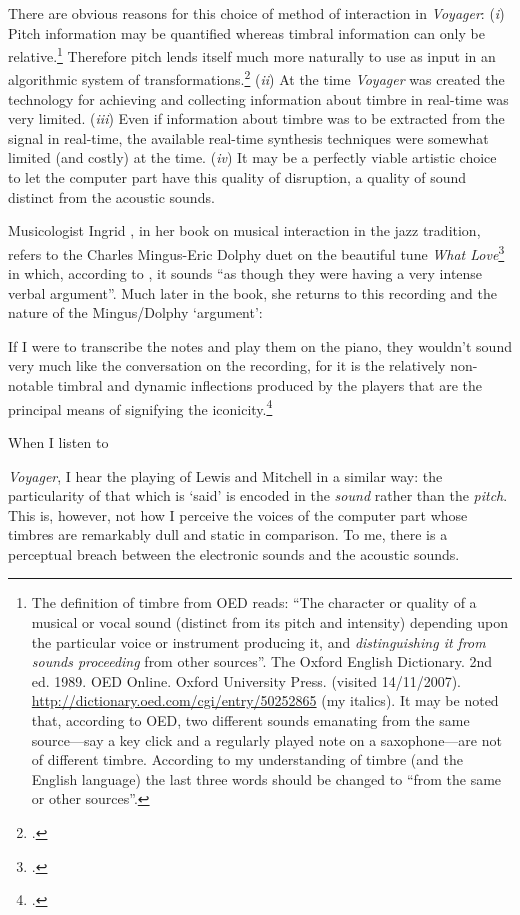 There are obvious reasons for this choice of method of interaction in \emph{Voyager}: (\textit{i}) Pitch information may be quantified whereas timbral information can only be relative.\footnote{The definition of timbre from OED reads: ``The character or quality of a musical or vocal sound (distinct from its pitch and intensity) depending upon the particular voice or instrument producing it, and \emph{distinguishing it from sounds proceeding} from other sources''. The Oxford English Dictionary.  2nd ed. 1989. OED Online. Oxford University Press. (visited 14/11/2007). \url{http://dictionary.oed.com/cgi/entry/50252865} (my italics). It may be noted that, according to OED, two different sounds emanating from the same source---say a key click and a regularly played note on a saxophone---are not of different timbre. According to my understanding of timbre (and the English language) the last three words should be changed to ``from the same or other sources''.} Therefore pitch lends itself much more naturally to use as input in an algorithmic system of transformations.\footcite[Compare with electro-acoustic music composer and improviser Trevor Wishart's reasoning in][chap. 2]{wis96} (\textit{ii}) At the time \emph{Voyager} was created the technology for achieving and collecting information about timbre in real-time was very limited. (\textit{iii}) Even if information about timbre was to be extracted from the signal in real-time, the available real-time synthesis techniques were somewhat limited (and costly) at the time. (\textit{iv}) It may be a perfectly viable artistic choice to let the computer part have this quality of disruption, a quality of sound distinct from the acoustic sounds.

Musicologist Ingrid \citeauthor{monson96}, in her book on musical interaction in the jazz tradition, refers to the Charles Mingus-Eric Dolphy duet on the beautiful tune \emph{What Love}\footcite{mingus60} in which, according to \citeauthor{monson96}, it sounds ``as though they were having a very intense verbal argument''. Much later in the book, she returns to this recording and
the nature of the Mingus/Dolphy `argument':
\begin{squote} 
If I were to transcribe the notes and play them on the piano, they wouldn't sound very much like the conversation on the recording, for it is the relatively non-notable timbral and dynamic inflections produced by the players that are the principal means of signifying the iconicity.\footcite[208]{monson96}
\end{squote}
\hypertarget{sec:target:music-pract-inter-1}{When I listen to} \emph{Voyager}, I hear the playing of Lewis and Mitchell in a similar way: the particularity of that which is `said' is encoded in the \emph{sound} rather than the \emph{pitch}. This is, however, not how I perceive the voices of the computer part whose timbres are remarkably dull and static in comparison. To me, there is a perceptual breach between the electronic sounds and the acoustic sounds. 

